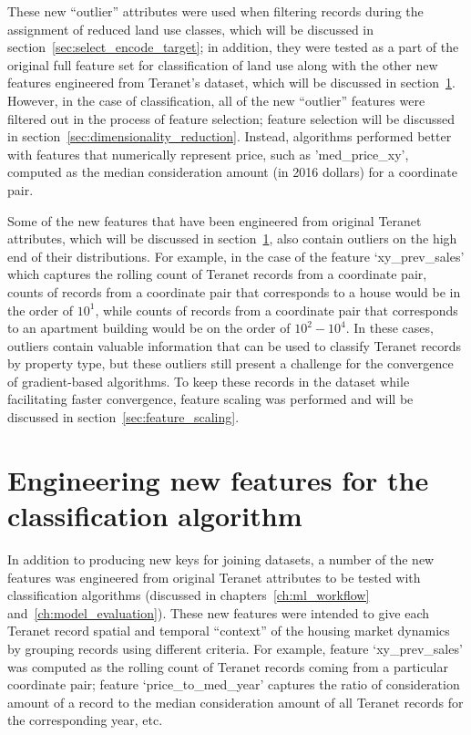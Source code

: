 These new ``outlier'' attributes were used when filtering records during the assignment of reduced land use classes, which will be discussed in section~\ref{sec:select_encode_target};
in addition, they were tested as a part of the original full feature set for classification of land use along with the other new features engineered from Teranet's dataset, which will be discussed in section~\ref{sec:feature_engineering}.
However, in the case of classification, all of the new ``outlier'' features were filtered out in the process of feature selection;
feature selection will be discussed in section~\ref{sec:dimensionality_reduction}.
Instead, algorithms performed better with features that numerically represent price, such as 'med\_price\_xy', computed as the median consideration amount (in 2016 dollars) for a coordinate pair.

Some of the new features that have been engineered from original Teranet attributes, which will be discussed in section~\ref{sec:feature_engineering}, also contain outliers on the high end of their distributions.
For example, in the case of the feature `xy\_prev\_sales' which captures the rolling count of Teranet records from a coordinate pair, counts of records from a coordinate pair that corresponds to a house would be in the order of $10^1$, while counts of records from a coordinate pair that corresponds to an apartment building would be on the order of $10^2-10^4$.
In these cases, outliers contain valuable information that can be used to classify Teranet records by property type, but these outliers still present a challenge for the convergence of gradient-based algorithms.
To keep these records in the dataset while facilitating faster convergence, feature scaling was performed and will be discussed in section~\ref{sec:feature_scaling}.

\section{Engineering new features for the classification algorithm} \label{sec:feature_engineering}

In addition to producing new keys for joining datasets, a number of the new features was engineered from original Teranet attributes to be tested with classification algorithms (discussed in chapters~\ref{ch:ml_workflow} and~\ref{ch:model_evaluation}).
These new features were intended to give each Teranet record spatial and temporal ``context'' of the housing market dynamics by grouping records using different criteria.
For example, feature `xy\_prev\_sales' was computed as the rolling count of Teranet records coming from a particular coordinate pair;
feature `price\_to\_med\_year' captures the ratio of consideration amount of a record to the median consideration amount of all Teranet records for the corresponding year, etc.

